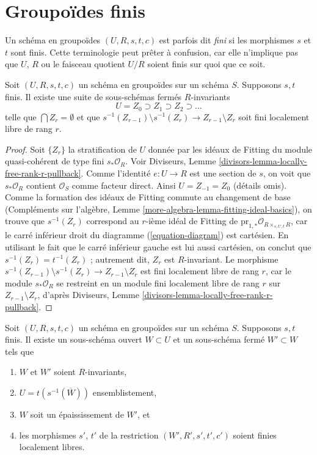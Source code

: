 \section{Groupoïdes finis}
\label{section-finite-groupoids}

\noindent
Un schéma en groupoïdes $(U, R, s, t, c)$ est parfois dit {\it fini} si les
morphismes $s$ et $t$ sont finis. Cette terminologie peut prêter à confusion, car elle
n'implique pas que $U$, $R$ ou le faisceau quotient $U/R$ soient finis sur quoi que ce soit.

\begin{lemma}
\label{lemma-finite-stratify}
Soit $(U, R, s, t, c)$ un schéma en groupoïdes sur un schéma $S$. Supposons $s, t$
finis. Il existe une suite de sous-schémas fermés $R$-invariants
$$
U = Z_0 \supset Z_1 \supset Z_2 \supset \ldots
$$
telle que $\bigcap Z_r = \emptyset$ et que
$s^{-1}(Z_{r - 1}) \setminus s^{-1}(Z_r) \to Z_{r - 1} \setminus Z_r$
soit fini localement libre de rang $r$.
\end{lemma}

\begin{proof}
Soit $\{Z_r\}$ la stratification de $U$ donnée par les idéaux de Fitting
du module quasi-cohérent de type fini $s_*\mathcal{O}_R$. Voir
Diviseurs, Lemme \ref{divisors-lemma-locally-free-rank-r-pullback}.
Comme l'identité $e : U \to R$ est une section de $s$, on voit que
$s_*\mathcal{O}_R$ contient $\mathcal{O}_S$ comme facteur direct.
Ainsi $U = Z_{-1} = Z_0$ (détails omis).
Comme la formation des idéaux de Fitting commute au changement de base
(Compléments sur l'algèbre, Lemme \ref{more-algebra-lemma-fitting-ideal-basics}),
on trouve que $s^{-1}(Z_r)$ correspond au $r$-ième idéal de Fitting
de $\text{pr}_{1, *}\mathcal{O}_{R \times_{s, U, t} R}$, car
le carré inférieur droit du diagramme (\ref{equation-diagram}) est cartésien.
En utilisant le fait que le carré inférieur gauche est lui aussi cartésien, on conclut
que $s^{-1}(Z_r) = t^{-1}(Z_r)$ ; autrement dit, $Z_r$ est $R$-invariant.
Le morphisme
$s^{-1}(Z_{r - 1}) \setminus s^{-1}(Z_r) \to Z_{r - 1} \setminus Z_r$
est fini localement libre de rang $r$, car le module
$s_*\mathcal{O}_R$ se restreint en un module fini localement libre de rang $r$
sur $Z_{r - 1} \setminus Z_r$, d'après
Diviseurs, Lemme \ref{divisors-lemma-locally-free-rank-r-pullback}.
\end{proof}

\begin{lemma}
\label{lemma-finite-flat-over-almost-dense-subscheme}
Soit $(U, R, s, t, c)$ un schéma en groupoïdes sur un schéma $S$. Supposons $s, t$
finis. Il existe un sous-schéma ouvert $W \subset U$ et un sous-schéma fermé
$W' \subset W$ tels que
\begin{enumerate}
\item $W$ et $W'$ soient $R$-invariants,
\item $U = t(s^{-1}(\overline{W}))$ ensemblistement,
\item $W$ soit un épaississement de $W'$, et
\item les morphismes $s'$, $t'$ de la restriction $(W', R', s', t', c')$
soient finies localement libres.
\end{enumerate}
\end{lemma}

